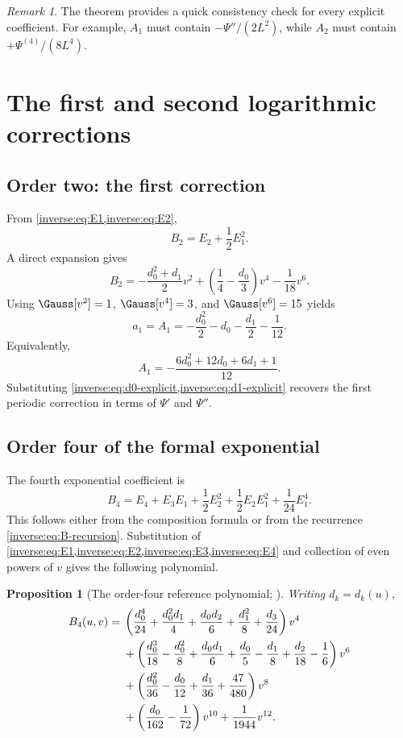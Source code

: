 \documentclass[11pt,oneside]{article}
\newtheorem{proposition}[theorem]{Proposition}
\theoremstyle{definition}
\theoremstyle{remark}
\newtheorem{remark}[theorem]{Remark}
\begin{document}
\begin{remark}
The theorem provides a quick consistency check for every explicit
coefficient.  For example, $A_1$ must contain
$-\Psi''/(2L^2)$, while $A_2$ must contain
$+\Psi^{(4)}/(8L^4)$.
\end{remark}

\section{The first and second logarithmic corrections}
\label{inverse:sec:second-correction}

\subsection{Order two: the first correction}

From \cref{inverse:eq:E1,inverse:eq:E2},
\[
 B_2=E_2+\frac12E_1^2.
\]
A direct expansion gives
\[
 B_2
 =-\frac{d_0^2+d_1}{2}v^2
   +\left(\frac14-\frac{d_0}{3}\right)v^4
   -\frac1{18}v^6.
\]
Using $\Gauss[v^2]=1$, $\Gauss[v^4]=3$, and
$\Gauss[v^6]=15$ yields
\begin{equation}
 a_1=A_1
 =-\frac{d_0^2}{2}-d_0-\frac{d_1}{2}-\frac1{12}.
 \label{inverse:eq:A1-jets}
\end{equation}
Equivalently,
\[
 A_1=-\frac{6d_0^2+12d_0+6d_1+1}{12}.
\]
Substituting \cref{inverse:eq:d0-explicit,inverse:eq:d1-explicit} recovers the first
periodic correction in terms of $\Psi'$ and $\Psi''$.

\subsection{Order four of the formal exponential}

The fourth exponential coefficient is
\begin{equation}
 B_4
 =E_4+E_3E_1+\frac12E_2^2
   +\frac12E_2E_1^2+\frac1{24}E_1^4.
 \label{inverse:eq:B4-identity}
\end{equation}
This follows either from the composition formula or from the recurrence
\eqref{inverse:eq:B-recursion}.  Substitution of
\cref{inverse:eq:E1,inverse:eq:E2,inverse:eq:E3,inverse:eq:E4} and collection of even powers of $v$
gives the following polynomial.

\begin{proposition}[The order-four reference polynomial; \Formalized]
\label{inverse:prop:B4-polynomial}
Writing $d_k=d_k(u)$,
\begin{align}
 B_4(u,v)={}&
 \left(\frac{d_0^4}{24}+\frac{d_0^2d_1}{4}
       +\frac{d_0d_2}{6}+\frac{d_1^2}{8}
       +\frac{d_3}{24}\right)v^4 \notag\\
 &+\left(\frac{d_0^3}{18}-\frac{d_0^2}{8}
       +\frac{d_0d_1}{6}+\frac{d_0}{5}
       -\frac{d_1}{8}+\frac{d_2}{18}
       -\frac16\right)v^6 \notag\\
 &+\left(\frac{d_0^2}{36}-\frac{d_0}{12}
       +\frac{d_1}{36}+\frac{47}{480}\right)v^8 \notag\\
 &+\left(\frac{d_0}{162}-\frac1{72}\right)v^{10}
   +\frac1{1944}v^{12}. \label{inverse:eq:B4-polynomial}
\end{align}
\end{proposition}
\end{document}

